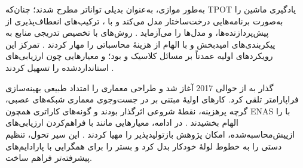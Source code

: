 به‌طور موازی،  به‌عنوان بدیلی تواناتر مطرح شدند؛ چنان‌که TPOT  یادگیری ماشین را به‌صورت برنامه‌هایی درخت‌ساختار مدل می‌کند و با ، ترکیب‌های انعطاف‌پذیری از پیش‌پردازنده‌ها،  و مدل‌ها را می‌آزماید \cite{pmlr-v64-olson_tpot_2016}. روش‌های  با تخصیص تدریجی منابع به پیکربندی‌های امیدبخش و با الهام از  هزینهٔ محاسباتی را مهار کردند \cite{pmlr-v51-jamieson16, JMLR:v18:16-558}. تمرکز این رویکردهای اولیه عمدتاً بر مسائل کلاسیک  و  بود؛ و معیارهایی چون  ارزیابی‌های استانداردشده را تسهیل کردند \cite{bischl2021openmlbenchmarkingsuites}.

گذار به  از حوالی 2017 آغاز شد و طراحی معماری را امتداد طبیعی بهینه‌سازی فراپارامتر تلقی کرد. کارهای اولیهٔ مبتنی بر  در جست‌وجوی معماری شبکه‌های عصبی، گرچه پرهزینه، نقطهٔ شروعی اثرگذار بودند و گونه‌های کاراتری همچون ENAS با  را الهام بخشیدند \cite{zoph2017neural, pmlr-v80-pham18a}. در ادامه، معیارهایی مانند  با فراهم‌کردن ارزیابی‌های ازپیش‌محاسبه‌شده، امکان پژوهش بازتولیدپذیر را مهیا کردند \cite{pmlr-v97-ying19a}. این سیر تحول، تنظیم دستی را به خطوط لولهٔ خودکار بدل کرد و بستر را برای همگرایی با پارادایم‌های پیشرفته‌تر فراهم ساخت.